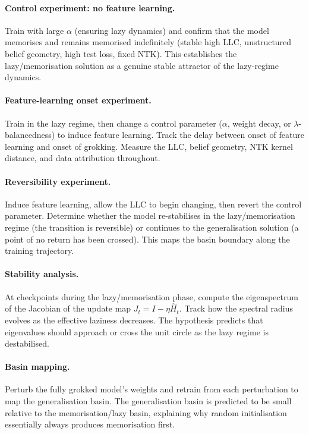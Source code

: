 \documentclass[11pt,a4paper]{article}
\begin{document}
\paragraph{Control experiment: no feature learning.} Train with large $\alpha$ (ensuring lazy dynamics) and confirm that the model memorises and remains memorised indefinitely (stable high LLC, unstructured belief geometry, high test loss, fixed NTK). This establishes the lazy/memorisation solution as a genuine stable attractor of the lazy-regime dynamics.

\paragraph{Feature-learning onset experiment.} Train in the lazy regime, then change a control parameter ($\alpha$, weight decay, or $\lambda$-balancedness) to induce feature learning. Track the delay between onset of feature learning and onset of grokking. Measure the LLC, belief geometry, NTK kernel distance, and data attribution throughout.

\paragraph{Reversibility experiment.} Induce feature learning, allow the LLC to begin changing, then revert the control parameter. Determine whether the model re-stabilises in the lazy/memorisation regime (the transition is reversible) or continues to the generalisation solution (a point of no return has been crossed). This maps the basin boundary along the training trajectory.

\paragraph{Stability analysis.} At checkpoints during the lazy/memorisation phase, compute the eigenspectrum of the Jacobian of the update map $J_t = I - \eta \hat{H}_t$. Track how the spectral radius evolves as the effective laziness decreases. The hypothesis predicts that eigenvalues should approach or cross the unit circle as the lazy regime is destabilised.

\paragraph{Basin mapping.} Perturb the fully grokked model's weights and retrain from each perturbation to map the generalisation basin. The generalisation basin is predicted to be small relative to the memorisation/lazy basin, explaining why random initialisation essentially always produces memorisation first.
\end{document}
